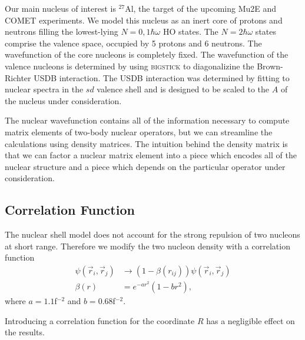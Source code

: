 \documentclass{book}[12pt]
\begin{document}
Our main nucleus of interest is $^{27}$Al, the target of the upcoming Mu2E and COMET experiments. We model this nucleus as an inert core of protons and neutrons filling the lowest-lying $N=0,1\hbar\omega$ HO states. The $N=2\hbar\omega$ states comprise the valence space, occupied by 5 protons and 6 neutrons. The wavefunction of the core nucleons is completely fixed. The wavefunction of the valence nucleons is determined by using \textsc{bigstick} to diagonalizine the Brown-Richter USDB interaction. The USDB interaction was determined by fitting to nuclear spectra in the $sd$ valence shell and is designed to be scaled to the $A$ of the nucleus under consideration.

The nuclear wavefunction contains all of the information necessary to compute matrix elements of two-body nuclear operators, but we can streamline the calculations using density matrices. The intuition behind the density matrix is that we can factor a nuclear matrix element into a piece which encodes all of the nuclear structure and a piece which depends on the particular operator under consideration. 
\subsection{Correlation Function}
\label{sec:cor_fun}
The nuclear shell model does not account for the strong repulsion of two nucleons at short range. Therefore we modify the two nucleon density with a correlation function
\begin{equation}
\begin{split}
\psi(\vec{r}_i,\vec{r}_j)&\rightarrow\left(1-\beta(r_{ij})\right)\psi(\vec{r}_i,\vec{r}_j)\\
\beta(r)&=e^{-ar^2}\left(1-br^2\right),
\label{eq:f_corr}
\end{split}
\end{equation}
where $a=1.1$f$^{-2}$ and $b=0.68$f$^{-2}$.

Introducing a correlation function for the coordinate $R$ has a negligible effect on the results.
\end{document}
